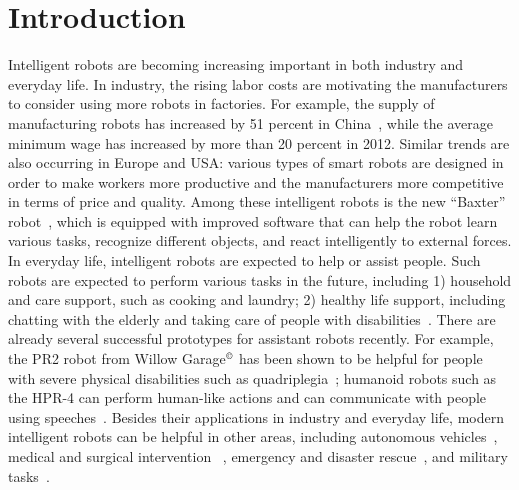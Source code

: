 \chapter{Introduction}
\label{chp:intro}
Intelligent robots are becoming increasing important in both industry and everyday life. In industry, the rising labor costs are motivating the manufacturers to consider using more robots in factories. For example, the supply of manufacturing robots has increased by 51 percent in China~\cite{IFR:report}, while the average minimum wage has increased by more than 20 percent in 2012. Similar trends are also occurring in Europe and USA: various types of smart robots are designed in order to make workers more productive and the manufacturers more competitive in terms of price and quality. Among these intelligent robots is the new ``Baxter'' robot~\cite{Brooks:2012:Baxter}, which is equipped with improved software that can help the robot learn various tasks, recognize different objects, and react intelligently to external forces. In everyday life, intelligent robots are expected to help or assist people. Such robots are expected to perform various tasks in the future, including 1) household and care support, such as cooking and laundry; 2) healthy life support, including chatting with the elderly and taking care of people with disabilities~\cite{Yamazaki:2012}. There are already several successful prototypes for assistant robots recently. For example, the PR2 robot from Willow Garage$^\copyright$ has been shown to be helpful for people with severe physical disabilities such as quadriplegia~\cite{PR2HumanityWeb}; humanoid robots such as the HPR-4 can perform human-like actions and can communicate with people using speeches~\cite{HRP-Cyber}. Besides their applications in industry and everyday life, modern intelligent robots can be helpful in other areas, including autonomous vehicles~\cite{Montemerlo:2008:JSE}, medical and surgical intervention ~\cite{Bonfe:2012}, emergency and disaster rescue~\cite{Fukushima:2011}, and military tasks~\cite{AlphaDog:2012}.



